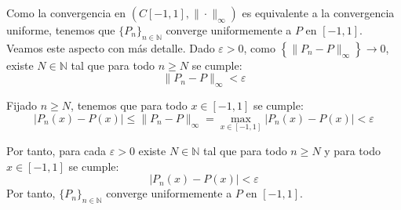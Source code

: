 \documentclass[12pt]{article}
\begin{document}
\begin{ejercicio}[3 puntos]
        Como la convergencia en $\left(C[-1,1],\|\cdot\|_\infty\right)$ es equivalente a la convergencia uniforme, tenemos que $\{P_n\}_{n\in \mathbb{N}}$ converge uniformemente a $P$ en $[-1,1]$. Veamos este aspecto con más detalle. Dado $\varepsilon>0$, como $\left\{\|P_n-P\|_\infty\right\} \to 0$, existe $N\in \mathbb{N}$ tal que para todo $n\ge N$ se cumple:
        \begin{equation*}
            \|P_n-P\|_\infty < \varepsilon
        \end{equation*}
        
        Fijado $n\ge N$, tenemos que para todo $x\in[-1,1]$ se cumple:
        \begin{equation*}
            |P_n(x)-P(x)|\le \|P_n-P\|_\infty=\max_{x\in[-1,1]} |P_n(x)-P(x)|<\varepsilon
        \end{equation*}

        Por tanto, para cada $\varepsilon>0$ existe $N\in \mathbb{N}$ tal que para todo $n\ge N$ y para todo $x\in[-1,1]$ se cumple:
        \begin{equation*}
            |P_n(x)-P(x)|<\varepsilon
        \end{equation*}
        Por tanto, $\{P_n\}_{n\in \mathbb{N}}$ converge uniformemente a $P$ en $[-1,1]$.
    \end{ejercicio}
\end{document}

